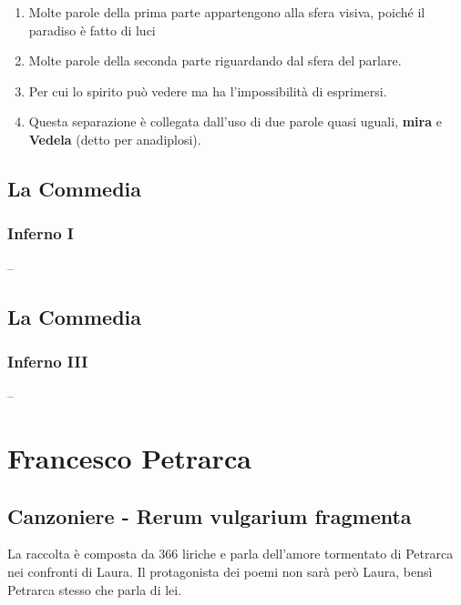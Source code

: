 \documentclass{article}
\begin{document}
\begin{enumerate}
    \item Molte parole della prima parte appartengono alla sfera visiva, poiché il paradiso è fatto di luci
    \item Molte parole della seconda parte riguardando dal sfera del parlare.
    \item Per cui lo spirito può vedere ma ha l'impossibilità di esprimersi.
    \item Questa separazione è collegata dall'uso di due parole quasi uguali, \textbf{mira} e \textbf{Vedela} (detto per anadiplosi).
\end{enumerate}

\newpage
\subsection{La Commedia}
\subsubsection{Inferno I}

--

\newpage
\subsection{La Commedia}
\subsubsection{Inferno III}

--

\newpage
\section{Francesco Petrarca}
\subsection{Canzoniere - Rerum vulgarium fragmenta}
La raccolta è composta da 366 liriche e parla dell'amore tormentato di Petrarca nei confronti
di Laura. Il protagonista dei poemi non sarà però Laura, bensì Petrarca stesso che parla di lei.
\end{document}
